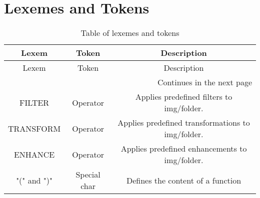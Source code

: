 \section{Lexemes and Tokens}
\begin{longtable}[c]{|c|c|c|}
\caption{Table of lexemes and tokens}\\
\hline
    Lexem & Token & Description \\
\hline
\endfirsthead
\hline
    Lexem & Token & Description \\
\hline
\endhead %
\hline \multicolumn{3}{r}{{Continues in the next page}} \\ \hline
\endfoot %
\hline
\endlastfoot %
\hline

\hline
    FILTER & Operator & Applies predefined filters to img/folder. \\
    TRANSFORM & Operator & Applies predefined transformations  to img/folder. \\
    ENHANCE & Operator & Applies predefined enhancements  to img/folder. \\
    "(" and ")" & Special char & Defines the content of a function \\
\hline

\end{longtable}